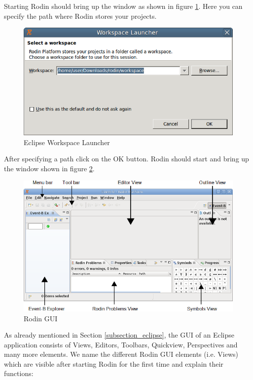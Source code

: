 Starting Rodin should bring up the window as shown in figure \ref{fig_tut_02_workspace_launcher}. Here you can specify the path where Rodin stores your projects.

\begin{figure}[!h]
\begin{center}
	\includegraphics{img/tutorial/tut_02_install1.png}
	\caption{Eclipse Workspace Launcher}
	\label{fig_tut_02_workspace_launcher}
\end{center}
\end{figure}

After specifying a path click on the \textsf{OK} button. Rodin should start and bring up the window shown in figure \ref{fig_tut_02_rodin_gui}.

\begin{figure}[!h]
\begin{center}
	\includegraphics{img/tutorial/tut_02_install2.png}
	\caption{Rodin GUI}
	\label{fig_tut_02_rodin_gui}
\end{center}
\end{figure}

As already mentioned in Section \ref{subsection_eclipse}, the GUI of an Eclipse application consists of Views, Editors, Toolbars, Quickview, Perspectives and many more elements. We name the different Rodin GUI elements (i.e. Views) which are visible after starting Rodin for the first time and explain their functions:

